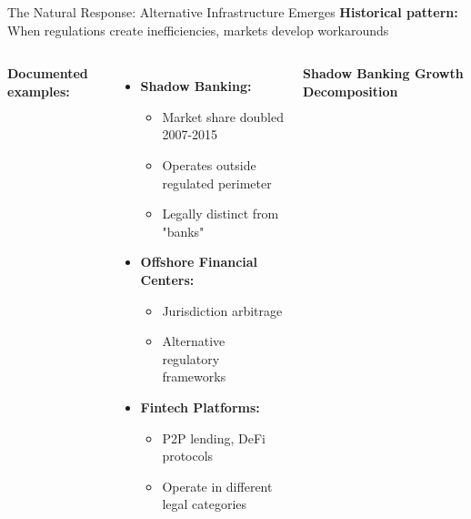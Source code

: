 \documentclass[aspectratio=169]{beamer}
\begin{document}
\begin{frame}{The Natural Response: Alternative Infrastructure Emerges}
    \textbf{Historical pattern:} When regulations create inefficiencies, markets develop workarounds
    
    \vspace{0.3cm}
    \begin{columns}
        \textbf{Documented examples:}
        \begin{itemize}
            \item \textbf{Shadow Banking:}
            \begin{itemize}
                \item Market share doubled 2007-2015
                \item Operates outside regulated perimeter
                \item Legally distinct from "banks"
            \end{itemize}
            
            \item \textbf{Offshore Financial Centers:}
            \begin{itemize}
                \item Jurisdiction arbitrage
                \item Alternative regulatory frameworks
            \end{itemize}
            
            \item \textbf{Fintech Platforms:}
            \begin{itemize}
                \item P2P lending, DeFi protocols
                \item Operate in different legal categories
            \end{itemize}
        \end{itemize}
        
        
        
        \vspace{0.3cm}
        \centering
        \textbf{Shadow Banking Growth Decomposition}
        

\end{columns}
\end{frame}
\end{document}

